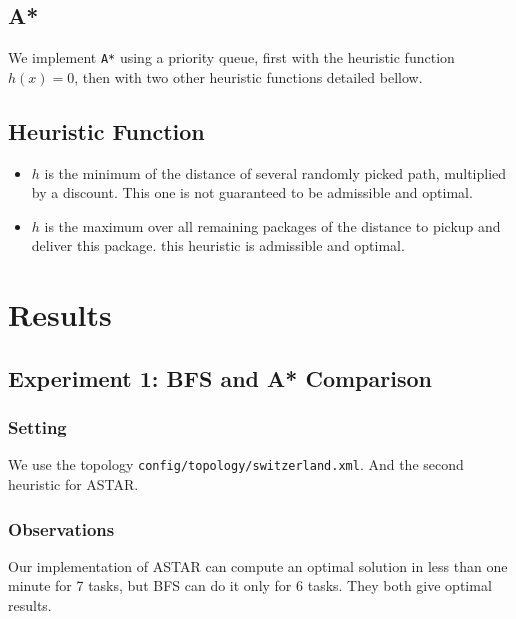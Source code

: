 \documentclass[11pt]{article}
\begin{document}
\subsection{A*}
We implement \verb|A*| using a priority queue, first with the heuristic function $h(x) = 0$, then with two other heuristic functions detailed bellow.

\subsection{Heuristic Function}
\begin{itemize}
\item $h$ is the minimum of the distance of several randomly picked path, multiplied by a discount. This one is not guaranteed to be admissible and optimal.
\item $h$ is the maximum over all remaining packages of the distance to pickup and deliver this package. this heuristic is admissible and optimal.
\end{itemize}

\section{Results}

\subsection{Experiment 1: BFS and A* Comparison}

\subsubsection{Setting}
We use the topology \verb|config/topology/switzerland.xml|. And the second heuristic for ASTAR.

\subsubsection{Observations}
Our implementation of ASTAR can compute an optimal solution in less than one minute for 7 tasks, but BFS can do it only for 6 tasks. They both give optimal results.
\end{document}
